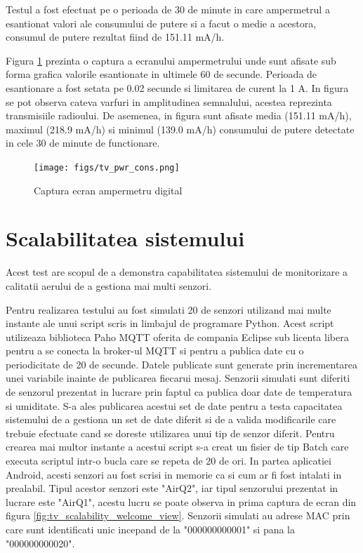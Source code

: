 Testul a fost efectuat pe o perioada de 30 de minute in care ampermetrul a esantionat valori ale consumului de putere si a facut o medie a acestora, consumul de putere 
rezultat fiind de 151.11 mA/h.

Figura \ref{fig:tv_pwr_cons} prezinta o captura a ecranului ampermetrului unde sunt afisate sub forma grafica valorile esantionate in ultimele 60 de secunde. Perioada 
de esantionare a fost setata pe 0.02 secunde si limitarea de curent la 1 A. In figura se pot observa cateva varfuri in amplitudinea semnalului, acestea reprezinta 
transmisiile radioului. De asemenea, in figura sunt afisate media (151.11 mA/h), maximul (218.9 mA/h) si minimul (139.0 mA/h) consumului de putere detectate in cele 
30 de minute de functionare.
\begin{figure}[H]
    \centering
    \texttt{[image: figs/tv\_pwr\_cons.png]}
    \caption{Captura ecran ampermetru digital}
    \label{fig:tv_pwr_cons}
\end{figure}

\section{Scalabilitatea sistemului}\label{sec:tv_scalability}
Acest test are scopul de a demonstra capabilitatea sistemului de monitorizare a calitatii aerului de a gestiona mai multi senzori.

Pentru realizarea testului au fost simulati 20 de senzori utilizand mai multe instante ale unui script scris in limbajul de programare Python. Acest script utilizeaza 
biblioteca Paho MQTT oferita de compania Eclipse sub licenta libera pentru a se conecta la broker-ul MQTT si pentru a publica date cu o periodicitate de 20 de secunde. 
Datele publicate sunt generate prin incrementarea unei variabile inainte de publicarea fiecarui mesaj. Senzorii simulati sunt diferiti de senzorul prezentat in lucrare 
prin faptul ca publica doar date de temperatura si umiditate. S-a ales publicarea acestui set de date pentru a testa capacitatea sistemului de a gestiona un set de date 
diferit si de a valida modificarile care trebuie efectuate cand se doreste utilizarea unui tip de senzor diferit. Pentru crearea mai multor instante a acestui script s-a 
creat un fisier de tip Batch care executa scriptul intr-o bucla care se repeta de 20 de ori. In partea aplicatiei Android, acesti senzori au fost scrisi in memorie ca si 
cum ar fi fost intalati in prealabil. Tipul acestor senzori este "AirQ2", iar tipul senzorului prezentat in lucrare este "AirQ1", acestu lucru se poate observa in prima 
captura de ecran din figura \ref{fig:tv_scalability_welcome_view}. Senzorii simulati au adrese MAC prin care sunt identificati unic incepand de la "000000000001" si pana 
la "000000000020".

